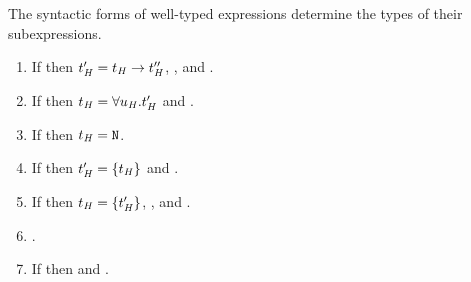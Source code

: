 \begin{lemma}

\label{leminv}

The syntactic forms of well-typed expressions determine the types of their subexpressions.

\begin{enumerate}



\item If \judeh{\env}{\expfabss{\varvarh}{\first{\vartyh}}{\varexph}}{\second{\vartyh}} then $t_{\mathit{H}}' = t_{\mathit{H}} \rightarrow t_{\mathit{H}}''$, \judth{\env}{\first{\vartyh}}, and \judeh{\envexte{\varvarh}{\first{\vartyh}}}{\varexph}{\third{\vartyh}}.


\item If \judeh{\env}{\exptabs{\tyvarh}{\varexph}}{\first{\vartyh}} then $t_{\mathit{H}} = \forall u_{\mathit{H}} . t_{\mathit{H}}'$ and \judeh{\envextt{\tyvarh}}{\varexph}{\second{\vartyh}}.


\item If \judeh{}{\expnum{\symnum}}{\vartyh} then $t_{\mathit{H}} = \mathtt{N}$.


\item If \judeh{\env}{\expnils{\first{\vartyh}}}{\second{\vartyh}} then $t_{\mathit{H}}' = \lbrace t_{\mathit{H}} \rbrace$ and \judth{\env}{\first{\vartyh}}.


\item If \judeh{\env}{\expcons{\first{\varexph}}{\second{\varexph}}}{\first{\vartyh}} then $t_{\mathit{H}} = \lbrace t_{\mathit{H}}' \rbrace$, \judeh{\env}{\first{\varexph}}{\second{\vartyh}}, and \judeh{\env}{\second{\varexph}}{\tylist{\second{\vartyh}}}.


\item \judeh{\envexte{\varvarh}{\vartyh}}{\varvarh}{\vartyh}.


\item If \judeh{\env}{\expfapp{\first{\varexph}}{\second{\varexph}}}{\first{\vartyh}} then \judeh{\env}{\first{\varexph}}{\tyfun{\second{\vartyh}}{\first{\vartyh}}} and \judeh{\env}{\second{\varexph}}{\second{\vartyh}}.



\end{enumerate}
\end{lemma}
